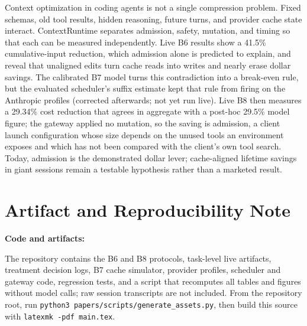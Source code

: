 \documentclass[10pt,twocolumn]{article}
\begin{document}
Context optimization in coding agents is not a single compression problem.  Fixed schemas, old tool
results, hidden reasoning, future turns, and provider cache state interact.  ContextRuntime separates
admission, safety, mutation, and timing so that each can be measured independently.  Live B6 results
show a 41.5\% cumulative-input reduction, which admission alone is predicted to explain, and reveal
that unaligned edits turn cache reads into writes and nearly erase dollar savings.  The calibrated B7
model turns this contradiction into a break-even rule, but the evaluated scheduler's suffix estimate
kept that rule from firing on the Anthropic profiles (corrected afterwards; not yet run live).  Live B8 then measures a 29.34\% cost reduction
that agrees in aggregate with a post-hoc 29.5\% model figure; the gateway applied no mutation, so the
saving is admission, a client launch configuration whose size depends on the unused tools an
environment exposes and which has not been compared with the client's own tool search.  Today,
admission is the demonstrated dollar lever; cache-aligned lifetime savings in giant sessions remain a
testable hypothesis rather than a marketed result.

\section*{Artifact and Reproducibility Note}

\noindent\textbf{Code and artifacts:} \repo\par\smallskip
The repository contains the B6 and B8 protocols, task-level live artifacts, treatment decision logs,
B7 cache simulator, provider profiles, scheduler and gateway code, regression tests, and a script that
recomputes all tables and figures without model calls; raw session transcripts are not included.  From
the repository root, run \texttt{python3 papers/scripts/generate\_assets.py}, then build this source
with \texttt{latexmk -pdf main.tex}.



\end{document}
